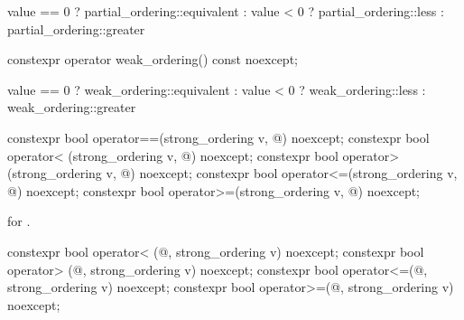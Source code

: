 \begin{itemdescr}
\pnum
\returns
\begin{codeblock}
value == 0 ? partial_ordering::equivalent :
value < 0  ? partial_ordering::less :
             partial_ordering::greater
\end{codeblock}
\end{itemdescr}

%
\begin{itemdecl}
constexpr operator weak_ordering() const noexcept;
\end{itemdecl}

\begin{itemdescr}
\pnum
\returns
\begin{codeblock}
value == 0 ? weak_ordering::equivalent :
value < 0  ? weak_ordering::less :
             weak_ordering::greater
\end{codeblock}
\end{itemdescr}

%
%
%
%
%
\begin{itemdecl}
constexpr bool operator==(strong_ordering v, @\unspec@) noexcept;
constexpr bool operator< (strong_ordering v, @\unspec@) noexcept;
constexpr bool operator> (strong_ordering v, @\unspec@) noexcept;
constexpr bool operator<=(strong_ordering v, @\unspec@) noexcept;
constexpr bool operator>=(strong_ordering v, @\unspec@) noexcept;
\end{itemdecl}

\begin{itemdescr}
\pnum
\returns
{} for .
\end{itemdescr}

%
%
%
%
\begin{itemdecl}
constexpr bool operator< (@\unspec@, strong_ordering v) noexcept;
constexpr bool operator> (@\unspec@, strong_ordering v) noexcept;
constexpr bool operator<=(@\unspec@, strong_ordering v) noexcept;
constexpr bool operator>=(@\unspec@, strong_ordering v) noexcept;
\end{itemdecl}

